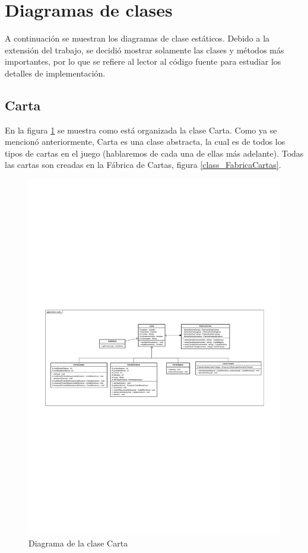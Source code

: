 	\clearpage
	\section{Diagramas de clases}
	
	A continuación se muestran los diagramas de clase estáticos. Debido a la extensión del trabajo, se decidió mostrar solamente las clases y métodos más importantes, por lo que se refiere al lector al código fuente para estudiar los detalles de implementación.
	
	\subsection{Carta}
	
	En la figura \ref{class_Carta} se muestra como está organizada la clase Carta. Como ya se mencionó anteriormente, Carta es una clase abstracta, la cual es  de todos los tipos de cartas en el juego (hablaremos de cada una de ellas más adelante). Todas las cartas son creadas en la Fábrica de Cartas, figura \ref{class_FabricaCartas}.
	
	\begin{figure}[H]
		\centering
		\includegraphics[scale=0.8]{includes/class_Carta}
		\caption{Diagrama de la clase Carta}
		\label{class_Carta}
	\end{figure}
	

